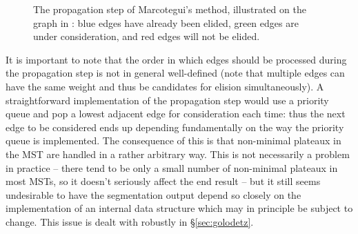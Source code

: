 \documentclass[a4paper]{article}
\newenvironment{stusubfig}[1]
{
	\begin{figure}[#1]
	\begin{center}
}
{
	\end{center}
	\end{figure}
}
\begin{document}
\begin{stusubfig}{p}
	\hspace{4mm}%
	\hspace{4mm}%
\caption{The propagation step of Marcotegui's method, illustrated on the graph in \cite{marcotegui05}: blue edges have already been elided, green edges are under consideration, and red edges will not be elided.}
\label{fig:segmentation-waterfall-marcotegui-propagation}
\end{stusubfig}

\noindent It is important to note that the order in which edges should be processed during the propagation step is not in general well-defined (note that multiple edges can have the same weight and thus be candidates for elision simultaneously). A straightforward implementation of the propagation step would use a priority queue and pop a lowest adjacent edge for consideration each time: thus the next edge to be considered ends up depending fundamentally on the way the priority queue is implemented. The consequence of this is that non-minimal plateaux in the MST are handled in a rather arbitrary way. This is not necessarily a problem in practice -- there tend to be only a small number of non-minimal plateaux in most MSTs, so it doesn't seriously affect the end result -- but it still seems undesirable to have the segmentation output depend so closely on the implementation of an internal data structure which may in principle be subject to change. This issue is dealt with robustly in \S\ref{sec:golodetz}.
\end{document}
